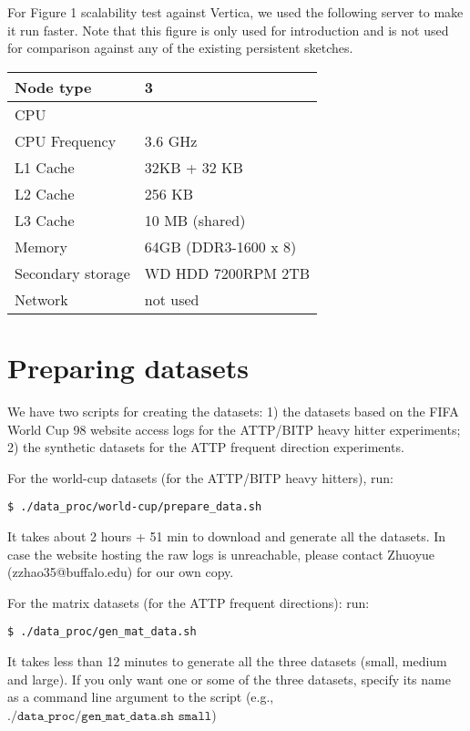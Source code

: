 \documentclass[11pt]{article}
\begin{document}
For Figure 1 scalability test against Vertica, we used the following
server to make it run faster. Note that this figure is only used for
introduction and is not used for comparison against any of the
existing persistent sketches.

\vspace{1mm}
\begin{tabular}{|l|l|}
    \hline
	Node type &  3 \\\hline
	CPU & \\\hline
	CPU Frequency & 3.6 GHz \\\hline
	L1 Cache & 32KB + 32 KB \\\hline
	L2 Cache & 256 KB \\\hline
	L3 Cache & 10 MB (shared)  \\\hline
	Memory & 64GB (DDR3-1600 x 8)  \\\hline
	Secondary storage & WD HDD 7200RPM 2TB \\\hline
	Network & not used \\\hline
\end{tabular}
\vspace{1mm}


\section{Preparing datasets}

We have two scripts for creating the datasets: 1) the datasets based
on the FIFA World Cup 98 website access logs for the ATTP/BITP heavy
hitter experiments; 2) the synthetic datasets for the ATTP
frequent direction experiments. 

For the world-cup datasets (for the ATTP/BITP heavy hitters), run:
\begin{verbatim}
$ ./data_proc/world-cup/prepare_data.sh
\end{verbatim}
It takes about 2 hours + 51 min to download and generate all the datasets. In
case the website hosting the raw logs is unreachable, please contact
Zhuoyue (zzhao35@buffalo.edu) for our own copy.

For the matrix datasets (for the ATTP frequent directions): run:
\begin{verbatim}
$ ./data_proc/gen_mat_data.sh
\end{verbatim}
It takes less than 12 minutes to generate all the three datasets (small,
medium and large). If you only want one or some of the three datasets,
specify its name as a command line argument to the script (e.g.,
$\texttt{./data\_proc/gen\_mat\_data.sh small}$)
\end{document}
